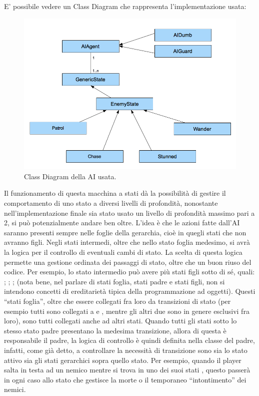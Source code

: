 E' possibile vedere un Class Diagram che rappresenta l'implementazione usata:

\begin{figure}[h]
\centerline{\includegraphics[scale=0.45]{images/development/classdiagramAI.png}}
\caption{Class Diagram della AI usata.}
\label{fig:classdiagramAI}
\end{figure}

Il funzionamento di questa macchina a stati dà la possibilità di gestire il comportamento di uno stato a diversi livelli di profondità, nonostante nell'implementazione finale sia stato usato un livello di profondità massimo pari a 2, si può potenzialmente andare ben oltre.
L'idea è che le azioni fatte dall'AI saranno presenti sempre nelle foglie della gerarchia, cioè in quegli stati che non avranno figli. Negli stati intermedi, oltre che nello stato foglia medesimo, si avrà la logica per il controllo di eventuali cambi di stato.
La scelta di questa logica permette una gestione ordinata dei passaggi di stato, oltre che un buon riuso del codice. Per esempio, lo stato intermedio  può avere più stati figli sotto di sé, quali: ; ; ;  (nota bene, nel parlare di stati foglia, stati padre e stati figli, non si intendono concetti di ereditarietà tipica della programmazione ad oggetti). Questi ``stati foglia'', oltre che essere collegati fra loro da transizioni di stato (per esempio tutti sono collegati a  e , mentre gli altri due sono in genere esclusivi fra loro), sono tutti collegati anche ad altri stati. Quando tutti gli stati sotto lo stesso stato padre presentano la medesima transizione, allora di questa è responsabile il padre, la logica di controllo è quindi definita nella classe del padre, infatti, come già detto, a controllare la necessità di transizione sono sia lo stato attivo sia gli stati gerarchici sopra quello stato. Per esempio, quando il player salta in testa ad un nemico mentre si trova in uno dei suoi stati , questo passerà in ogni caso allo stato  che gestisce la morte o il temporaneo ``intontimento'' dei nemici.

